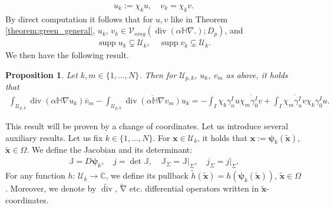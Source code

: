 \documentclass[report]{elsarticle}
\newtheorem{proposition}[theorem]{Proposition}
\numberwithin{theorem}{section}
\newcommand{\tbx}{\widetilde{\mathbf{x}}}
\newcommand{\bpsi}{\boldsymbol{\psi}}
\renewcommand{\vec}[1]{\mathbf{#1}}
\begin{document}
\begin{align*}
	u_k:=\chi_k u,\quad v_k=\chi_k v. 
\end{align*}
By direct computation it follows that for $u, v$ like in Theorem \ref{theorem:green_general}, $u_k,\, v_k\in \mathcal{V}_{sing}(\operatorname{div}(\alpha\mathbb{H}\nabla.); D_p)$, and 
\begin{align}
	\label{eq:support}
	\operatorname{supp}u_k\subsetneq \mathcal{U}_k, \quad 	\operatorname{supp}v_k\subsetneq \mathcal{U}_k.
\end{align}
We then have the following result. 
\begin{proposition}
	\label{prop:green_general_ingredient}
	Let $k,m\in\{1,\ldots, N\}$. Then for  $\mathcal{U}_{p,k}$, $u_k$, $v_m$ as above, it holds that 
	\begin{align}
		\label{eq:ukr}
		\int_{\mathcal{U}_{p,k}}\operatorname{div}(\alpha \mathbb{H}\nabla u_k)\overline{v}_m-	\int_{\mathcal{U}_{p,k}}\overline{\operatorname{div}(\alpha \mathbb{H}\nabla v_m)}{u}_k=-\int_{I}\chi_k\gamma_n^I u\overline{\chi_m \gamma_0^I v}+\int_{I}\overline{\chi_m\gamma_n^I v}{\chi_k \gamma_0^I u}.
	\end{align}
\end{proposition}
This result will be proven by a change of coordinates. Let us introduce several auxiliary results. Let us fix $k\in \{1,\ldots, N\}$. 
For $\vec{x}\in \mathcal{U}_{k}$, it holds that  $\vec{x}:=\bpsi_k(\widetilde{\vec{x}})$, $\widetilde{\vec{x}}\in \Omega$. We define the Jacobian and its determinant:
\begin{align*}
	{\mathbb{J}}=D\boldsymbol{\psi}_k, \quad  j=\operatorname{det}{\mathbb{J}}, \quad \mathbb{J}_{\Sigma}=\left. \mathbb{J}\right|_{\Sigma}, \quad j_{\Sigma}=\left. j\right|_{\Sigma}.
\end{align*}
For any function $h: \, \mathcal{U}_k\rightarrow \mathbb{C}$, we define its pullback  $\widetilde{h}(\tbx)=h({\bpsi}_k(\tbx))$, $\tbx\in \Omega$. Moreover, we denote by $\widetilde{\operatorname{div}}$, $\widetilde{\operatorname{\nabla}}$ etc. differential operators written in $\widetilde{\vec{x}}$-coordinates. 
\end{document}
